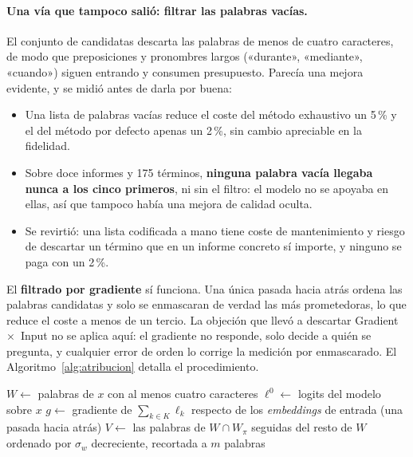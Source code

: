\paragraph{Una vía que tampoco salió: filtrar las palabras vacías.}
El conjunto de candidatas descarta las palabras de menos de cuatro caracteres, de modo que preposiciones y pronombres largos («durante», «mediante», «cuando») siguen entrando y consumen presupuesto. Parecía una mejora evidente, y se midió antes de darla por buena:

\begin{itemize}
 \item Una lista de palabras vacías reduce el coste del método exhaustivo un 5\,\% y el del método por defecto apenas un 2\,\%, sin cambio apreciable en la fidelidad.
 \item Sobre doce informes y 175 términos, \textbf{ninguna palabra vacía llegaba nunca a los cinco primeros}, ni sin el filtro: el modelo no se apoyaba en ellas, así que tampoco había una mejora de calidad oculta.
 \item Se revirtió: una lista codificada a mano tiene coste de mantenimiento y riesgo de descartar un término que en un informe concreto sí importe, y ninguno se paga con un 2\,\%.
\end{itemize}

El \textbf{filtrado por gradiente} sí funciona. Una única pasada hacia atrás ordena las palabras candidatas y solo se enmascaran de verdad las más prometedoras, lo que reduce el coste a menos de un tercio. La objeción que llevó a descartar Gradient~$\times$~Input no se aplica aquí: el gradiente no responde, solo decide a quién se pregunta, y cualquier error de orden lo corrige la medición por enmascarado. El Algoritmo~\ref{alg:atribucion} detalla el procedimiento.

\begin{algorithm}[ht]
\DontPrintSemicolon
\caption{Atribución por enmascarado con filtro de gradiente.}
\label{alg:atribucion}
$W \leftarrow$ palabras de $x$ con al menos cuatro caracteres\;
$\ell^{0} \leftarrow$ logits del modelo sobre $x$\;
$g \leftarrow$ gradiente de $\sum_{k \in K}\ell_k$ respecto de los \emph{embeddings} de entrada (una pasada hacia atrás)\;
$V \leftarrow$ las palabras de $W \cap W_\pi$ seguidas del resto de $W$ ordenado por $\sigma_w$ decreciente, recortada a $m$ palabras\;
\;
\end{algorithm}

